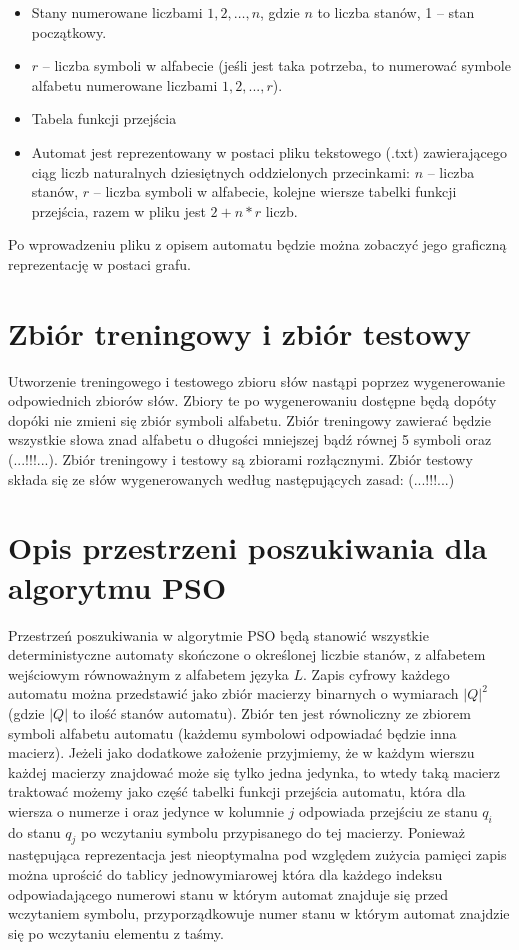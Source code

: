 \documentclass{mini}
\begin{document}
\begin{itemize}
	\item Stany numerowane liczbami $1, 2, …, n$, gdzie $n$ to liczba stanów, 1 – stan początkowy.
	\item $r$ – liczba symboli w alfabecie (jeśli jest taka potrzeba, to numerować symbole alfabetu numerowane liczbami $1, 2, ..., r$).
	\item Tabela funkcji przejścia
	\item Automat jest reprezentowany w postaci pliku tekstowego (.txt) zawierającego ciąg liczb naturalnych dziesiętnych oddzielonych przecinkami: $n$ – liczba stanów, $r$ – liczba symboli w alfabecie, kolejne wiersze tabelki funkcji przejścia, razem w pliku jest $2 + n*r$ liczb.
\end{itemize}

Po wprowadzeniu pliku z opisem automatu będzie można zobaczyć jego graficzną reprezentację w postaci grafu.

\section{Zbiór treningowy i zbiór testowy}

Utworzenie treningowego i testowego zbioru słów nastąpi poprzez wygenerowanie odpowiednich zbiorów słów. Zbiory te po wygenerowaniu dostępne będą dopóty dopóki nie zmieni się zbiór symboli alfabetu. Zbiór treningowy zawierać będzie wszystkie słowa znad alfabetu o długości mniejszej bądź równej 5 symboli oraz (...!!!...). Zbiór treningowy i testowy są zbiorami rozłącznymi. Zbiór testowy składa się ze słów wygenerowanych według następujących zasad: (...!!!...)

\section{Opis przestrzeni poszukiwania dla algorytmu PSO}

Przestrzeń poszukiwania w algorytmie PSO będą stanowić wszystkie deterministyczne automaty skończone o określonej liczbie stanów, z alfabetem wejściowym równoważnym z alfabetem języka $L$. Zapis cyfrowy każdego automatu można przedstawić jako zbiór macierzy binarnych o wymiarach $|Q|^2$ (gdzie $|Q|$ to ilość stanów automatu). Zbiór ten jest równoliczny ze zbiorem symboli alfabetu automatu (każdemu symbolowi odpowiadać będzie inna macierz). Jeżeli jako dodatkowe założenie przyjmiemy, że w każdym wierszu każdej macierzy znajdować może się tylko jedna jedynka, to wtedy taką macierz traktować możemy jako część tabelki funkcji przejścia automatu, która dla wiersza o numerze i oraz jedynce w kolumnie $j$ odpowiada przejściu ze stanu $q_{i}$ do stanu $q_{j}$ po wczytaniu symbolu przypisanego do tej macierzy. Ponieważ następująca reprezentacja jest nieoptymalna pod względem zużycia pamięci zapis można uprościć do tablicy jednowymiarowej która dla każdego indeksu odpowiadającego numerowi stanu w którym automat znajduje się przed wczytaniem symbolu, przyporządkowuje numer stanu w którym automat znajdzie się po wczytaniu elementu z taśmy.
\end{document}
